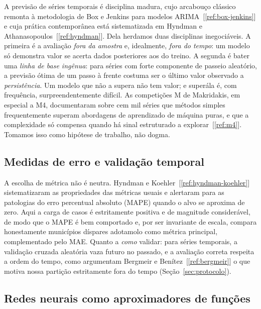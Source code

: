 \documentclass[12pt,a4paper,oneside]{article}
\newcommand{\C}[1]{[\ref{#1}]}
\begin{document}
A previsão de séries temporais é disciplina madura, cujo arcabouço
clássico remonta à metodologia de Box e Jenkins para modelos
ARIMA~\C{ref:box-jenkins} e cuja prática contemporânea está sistematizada
em Hyndman e Athanasopoulos~\C{ref:hyndman}. Dela herdamos duas
disciplinas inegociáveis. A primeira é a avaliação \emph{fora da amostra}
e, idealmente, \emph{fora do tempo}: um modelo só demonstra valor se
acerta dados posteriores aos do treino. A segunda é bater uma \emph{linha
de base ingênua}: para séries com forte componente de passeio aleatório, a
previsão ótima de um passo à frente costuma ser o último valor observado
\textemdash{} a \emph{persistência}. Um modelo que não a supera não tem
valor; e superá\-la é, com frequência, surpreendentemente difícil. As
competições M de Makridakis, em especial a M4, documentaram sobre cem mil
séries que métodos simples frequentemente superam abordagens de
aprendizado de máquina puras, e que a complexidade só compensa quando há
sinal estruturado a explorar~\C{ref:m4}. Tomamos isso como hipótese de
trabalho, não dogma.

\subsection{Medidas de erro e validação temporal}

A escolha de métrica não é neutra. Hyndman e Koehler~\C{ref:hyndman-koehler}
sistematizaram as propriedades das métricas usuais e alertaram para as
patologias do erro percentual absoluto (MAPE) quando o alvo se aproxima de
zero. Aqui a carga de casos é estritamente positiva e de magnitude
considerável, de modo que o MAPE é bem comportado e, por ser invariante de
escala, compara honestamente municípios díspares \textemdash{} adotamo\-lo
como métrica principal, complementado pelo MAE. Quanto a \emph{como}
validar: para séries temporais, a validação cruzada aleatória vaza futuro
no passado, e a avaliação correta respeita a ordem do tempo, como
argumentam Bergmeir e Benítez~\C{ref:bergmeir} \textemdash{} o que motiva
nossa partição estritamente fora do tempo (Seção~\ref{sec:protocolo}).

\subsection{Redes neurais como aproximadores de funções}
\end{document}
